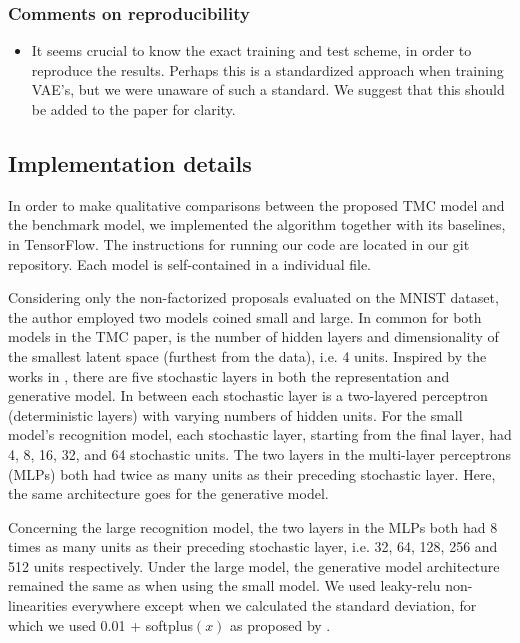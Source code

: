 \subsubsection*{Comments on reproducibility}
\begin{itemize}
    \item It seems crucial to know the exact training and test scheme, in order to reproduce the results. Perhaps this is a standardized approach when training VAE's, but we were unaware of such a standard. We suggest that this should be added to the paper for clarity.
\end{itemize}

\subsection{Implementation details}
\label{sec:imp_details}
In order to make qualitative comparisons between the proposed TMC model and the benchmark model, we implemented the algorithm together with its baselines, in TensorFlow. The instructions for running our code are located in our git repository. Each model is self-contained in a individual file. 

Considering only the non-factorized proposals evaluated on the MNIST dataset, the author employed two models coined small and large. In common for both models in the TMC paper, is the number of hidden layers and dimensionality of the smallest latent space (furthest from the data), i.e. 4 units. Inspired by the works in \cite{ladder}, there are five stochastic layers in both the representation and generative model. In between each stochastic layer is a two-layered perceptron (deterministic layers) with varying numbers of hidden units. For the small model's recognition model, each stochastic layer, starting from the final layer, had 4, 8, 16, 32, and 64 stochastic units. The two layers in the multi-layer perceptrons (MLPs) both had twice as many units as their preceding stochastic layer. Here, the same architecture goes for the generative model. 

Concerning the large recognition model, the two layers in the MLPs both had 8 times as many units as their preceding stochastic layer, i.e. 32, 64, 128, 256 and 512 units respectively. Under the large model, the generative model architecture remained the same as when using the small model. We used leaky-relu non-linearities everywhere except when we calculated the standard deviation, for which we used 0.01 + softplus$(x)$ as proposed by \cite{tmc}. 

